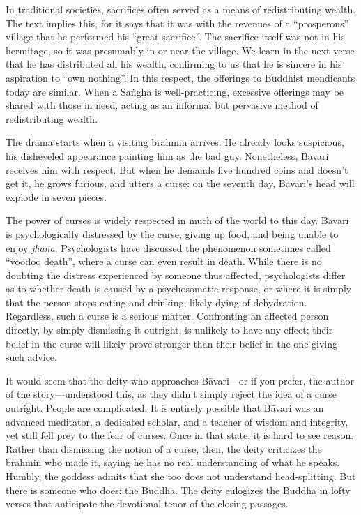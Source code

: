 \documentclass[12pt,openany]{book}%
\begin{document}
In traditional societies, sacrifices often served as a means of redistributing wealth. The text implies this, for it says that it was with the revenues of a “prosperous” village that he performed his “great sacrifice”. The sacrifice itself was not in his hermitage, so it was presumably in or near the village. We learn in the next verse that he has distributed all his wealth, confirming to us that he is sincere in his aspiration to “own nothing”. In this respect, the offerings to Buddhist mendicants today are similar. When a \textsanskrit{Saṅgha} is well-practicing, excessive offerings may be shared with those in need, acting as an informal but pervasive method of redistributing wealth.

The drama starts when a visiting brahmin arrives. He already looks suspicious, his disheveled appearance painting him as the bad guy. Nonetheless, \textsanskrit{Bāvari} receives him with respect. But when he demands five hundred coins and doesn’t get it, he grows furious, and utters a curse: on the seventh day, \textsanskrit{Bāvari}’s head will explode in seven pieces.

The power of curses is widely respected in much of the world to this day. \textsanskrit{Bāvari} is psychologically distressed by the curse, giving up food, and being unable to enjoy \textit{\textsanskrit{jhāna}}. Psychologists have discussed the phenomenon sometimes called “voodoo death”, where a curse can even result in death. While there is no doubting the distress experienced by someone thus affected, psychologists differ as to whether death is caused by a psychosomatic response, or where it is simply that the person stops eating and drinking, likely dying of dehydration. Regardless, such a curse is a serious matter. Confronting an affected person directly, by simply dismissing it outright, is unlikely to have any effect; their belief in the curse will likely prove stronger than their belief in the one giving such advice.

It would seem that the deity who approaches \textsanskrit{Bāvari}—or if you prefer, the author of the story—understood this, as they didn’t simply reject the idea of a curse outright. People are complicated. It is entirely possible that \textsanskrit{Bāvari} was an advanced meditator, a dedicated scholar, and a teacher of wisdom and integrity, yet still fell prey to the fear of curses. Once in that state, it is hard to see reason. Rather than dismissing the notion of a curse, then, the deity criticizes the brahmin who made it, saying he has no real understanding of what he speaks. Humbly, the goddess admits that she too does not understand head-splitting. But there is someone who does: the Buddha. The deity eulogizes the Buddha in lofty verses that anticipate the devotional tenor of the closing passages.
\end{document}
